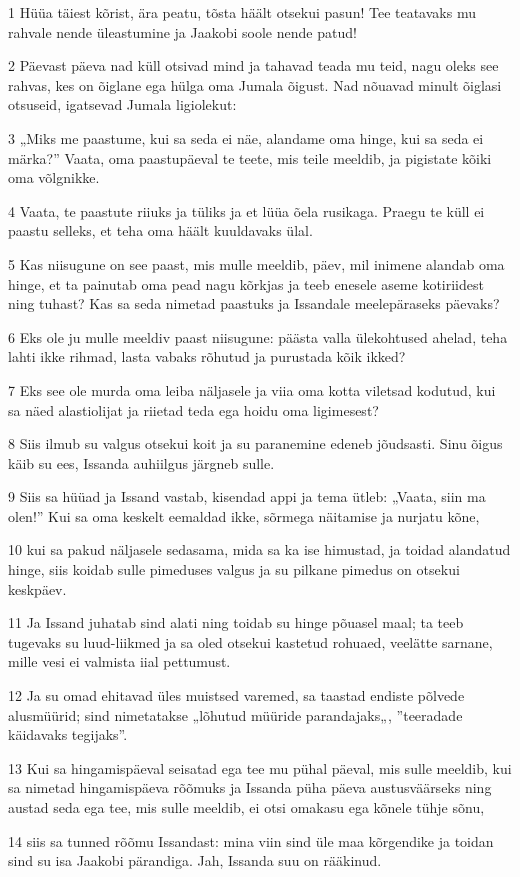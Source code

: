 \par 1 Hüüa täiest kõrist, ära peatu, tõsta häält otsekui pasun! Tee teatavaks mu rahvale nende üleastumine ja Jaakobi soole nende patud!
\par 2 Päevast päeva nad küll otsivad mind ja tahavad teada mu teid, nagu oleks see rahvas, kes on õiglane ega hülga oma Jumala õigust. Nad nõuavad minult õiglasi otsuseid, igatsevad Jumala ligiolekut:
\par 3 „Miks me paastume, kui sa seda ei näe, alandame oma hinge, kui sa seda ei märka?” Vaata, oma paastupäeval te teete, mis teile meeldib, ja pigistate kõiki oma võlgnikke.
\par 4 Vaata, te paastute riiuks ja tüliks ja et lüüa õela rusikaga. Praegu te küll ei paastu selleks, et teha oma häält kuuldavaks ülal.
\par 5 Kas niisugune on see paast, mis mulle meeldib, päev, mil inimene alandab oma hinge, et ta painutab oma pead nagu kõrkjas ja teeb enesele aseme kotiriidest ning tuhast? Kas sa seda nimetad paastuks ja Issandale meelepäraseks päevaks?
\par 6 Eks ole ju mulle meeldiv paast niisugune: päästa valla ülekohtused ahelad, teha lahti ikke rihmad, lasta vabaks rõhutud ja purustada kõik ikked?
\par 7 Eks see ole murda oma leiba näljasele ja viia oma kotta viletsad kodutud, kui sa näed alastiolijat ja riietad teda ega hoidu oma ligimesest?
\par 8 Siis ilmub su valgus otsekui koit ja su paranemine edeneb jõudsasti. Sinu õigus käib su ees, Issanda auhiilgus järgneb sulle.
\par 9 Siis sa hüüad ja Issand vastab, kisendad appi ja tema ütleb: „Vaata, siin ma olen!” Kui sa oma keskelt eemaldad ikke, sõrmega näitamise ja nurjatu kõne,
\par 10 kui sa pakud näljasele sedasama, mida sa ka ise himustad, ja toidad alandatud hinge, siis koidab sulle pimeduses valgus ja su pilkane pimedus on otsekui keskpäev.
\par 11 Ja Issand juhatab sind alati ning toidab su hinge põuasel maal; ta teeb tugevaks su luud-liikmed ja sa oled otsekui kastetud rohuaed, veelätte sarnane, mille vesi ei valmista iial pettumust.
\par 12 Ja su omad ehitavad üles muistsed varemed, sa taastad endiste põlvede alusmüürid; sind nimetatakse „lõhutud müüride parandajaks„, ”teeradade käidavaks tegijaks”.
\par 13 Kui sa hingamispäeval seisatad ega tee mu pühal päeval, mis sulle meeldib, kui sa nimetad hingamispäeva rõõmuks ja Issanda püha päeva austusväärseks ning austad seda ega tee, mis sulle meeldib, ei otsi omakasu ega kõnele tühje sõnu,
\par 14 siis sa tunned rõõmu Issandast: mina viin sind üle maa kõrgendike ja toidan sind su isa Jaakobi pärandiga. Jah, Issanda suu on rääkinud.

